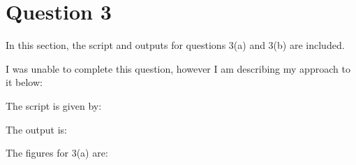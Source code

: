 \section{Question 3}

In this section, the script and outputs for questions 3(a) and 3(b) are included.

I was unable to complete this question, however I am describing my approach to it below:


 
The script is given by:

The output is:
%

The figures for 3(a) are:



